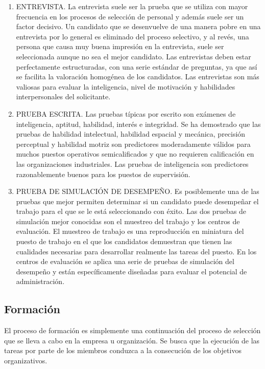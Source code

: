 \documentclass[
]{krantz}
\providecommand{\tightlist}{%
  \setlength{\itemsep}{0pt}\setlength{\parskip}{0pt}}
\begin{document}
\begin{enumerate}
\def\labelenumi{\arabic{enumi}.}
\tightlist
\item
  ENTREVISTA. La entrevista suele ser la prueba que se utiliza con mayor frecuencia en los procesos de selección de personal y además suele ser un factor decisivo. Un candidato que se desenvuelve de una manera pobre en una entrevista por lo general es eliminado del proceso selectivo, y al revés, una persona que causa muy buena impresión en la entrevista, suele ser seleccionada aunque no sea el mejor candidato. Las entrevistas deben estar perfectamente estructuradas, con una serie estándar de preguntas, ya que así se facilita la valoración homogénea de los candidatos. Las entrevistas son más valiosas para evaluar la inteligencia, nivel de motivación y habilidades interpersonales del solicitante.
\item
  PRUEBA ESCRITA. Las pruebas típicas por escrito son exámenes de inteligencia, aptitud, habilidad, interés e integridad. Se ha demostrado que las pruebas de habilidad intelectual, habilidad espacial y mecánica, precisión perceptual y habilidad motriz son predictores moderadamente válidos para muchos puestos operativos semicalificados y que no requieren calificación en las organizaciones industriales. Las pruebas de inteligencia son predictores razonablemente buenos para los puestos de supervisión.
\item
  PRUEBA DE SIMULACIÓN DE DESEMPEÑO. Es posiblemente una de las pruebas que mejor permiten determinar si un candidato puede desempeñar el trabajo para el que se le está seleccionando con éxito. Las dos pruebas de simulación mejor conocidas son el muestreo del trabajo y los centros de evaluación. El muestreo de trabajo es una reproducción en miniatura del puesto de trabajo en el que los candidatos demuestran que tienen las cualidades necesarias para desarrollar realmente las tareas del puesto. En los centros de evaluación se aplica una serie de pruebas de simulación del desempeño y están específicamente diseñadas para evaluar el potencial de administración.
\end{enumerate}

\hypertarget{formaciuxf3n}{%
\subsection{Formación}\label{formaciuxf3n}}

El proceso de formación es simplemente una continuación del proceso de selección que se lleva a cabo en la empresa u organización. Se busca que la ejecución de las tareas por parte de los miembros conduzca a la consecución de los objetivos organizativos.
\end{document}
